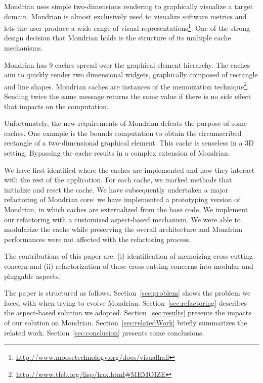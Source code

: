 \documentclass[preprint,10pt]{sigplanconf}
\newcommand{\secref}[1]{Section~\ref{sec:#1}\xspace}
\begin{document}
Mondrian uses simple two-dimensions rendering to graphically visualize a target domain. Mondrian is almost exclusively used to visualize software metrics and lets the user produce a wide range of visual representations\footnote{\url{http://www.moosetechnology.org/docs/visualhall}}.
One of the strong design decision that Mondrian holds is the structure of its multiple cache mechanisms. 

Mondrian has 9 caches spread over the graphical element hierarchy. 
The caches aim to quickly render two dimensional widgets, graphically composed of rectangle and line shapes. Mondrian caches are instances of the memoization technique\footnote{\url{http://www.tfeb.org/lisp/hax.html\#MEMOIZE}}. Sending twice the same message returns the same value if there is no side effect that impacts on the computation. 

Unfortunately, the new requirements of Mondrian defeats the purpose of some caches. One example is the bounds computation to obtain the circumscribed rectangle of a two-dimensional graphical element. This cache is senseless in a 3D setting. Bypassing the cache results in a complex extension of Mondrian.

We have first identified where the caches are implemented and how they interact with the rest of the application.
For each cache, we marked methods that initialize and reset the cache. 
We have subsequently undertaken a major refactoring of Mondrian core: we have implemented a prototyping version of Mondrian, in which caches are externalized from the base code. We implement our refactoring with a customized aspect-based mechanism.
We were able to modularize the cache while preserving the overall architecture and Mondrian performances were not affected with the refactoring process.

The contributions of this paper are: (i) identification of memoizing cross-cutting concern and (ii) refactorization of these cross-cutting concerns into modular and pluggable aspects.

The paper is structured as follows.
\secref{problem} shows the problem we faced with when trying to evolve Mondrian.
\secref{refactoring} describes the aspect-based solution we adopted.
\secref{results} presents the impacts of our solution on Mondrian.
\secref{relatedWork} briefly summarizes the related work.
\secref{conclusion} presents some conclusions.
\end{document}
